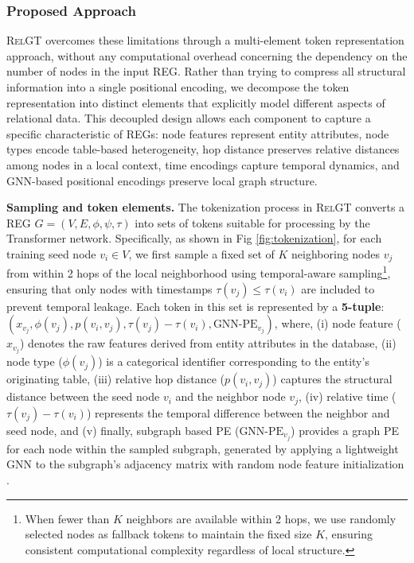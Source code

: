 \documentclass{article} %
\newcommand{\RelGT}{\textsc{RelGT}\xspace}
\begin{document}
\subsubsection{Proposed Approach}
\RelGT overcomes these limitations through a multi-element token representation approach, without any computational overhead concerning the dependency on the number of nodes in the input REG. Rather than trying to compress all structural information into a single positional encoding, we decompose the token representation into distinct elements that explicitly model different aspects of relational data. This decoupled
design allows each component to capture a specific characteristic of REGs: node features represent entity attributes, node types encode table-based heterogeneity, hop distance preserves relative distances among nodes in a local context, time encodings capture temporal dynamics, and GNN-based positional encodings preserve local graph structure. 


\textbf{Sampling and token elements.} The tokenization process in \RelGT converts a REG $G = (V, E, \phi, \psi, \tau)$ into sets of tokens suitable for processing by the Transformer network.
Specifically, as shown in Fig \ref{fig:tokenization}, for each training seed node $v_i \in V$, we first sample a fixed set of $K$ neighboring nodes $v_j$ from within 2 hops of the local neighborhood using temporal-aware sampling\footnote{When fewer than $K$ neighbors are available within 2 hops, we use randomly selected nodes as fallback tokens to maintain the fixed size $K$, ensuring consistent computational complexity regardless of local structure.}, ensuring that only nodes with timestamps $\tau(v_j) \leq \tau(v_i)$ are included to prevent temporal leakage. Each token in this set is represented by a \textbf{5-tuple}: $(x_{v_j}, \phi(v_j), p(v_i, v_j), \tau(v_j) - \tau(v_i), \text{GNN-PE}_{v_j})$, where, (i) node feature ($x_{v_j}$) denotes the raw features derived from entity attributes in the database, (ii) node type ($\phi(v_j)$) is a categorical identifier corresponding to the entity's originating table, (iii) relative hop distance ($p(v_i, v_j)$) captures the structural distance between the seed node $v_i$ and the neighbor node $v_j$, (iv) relative time ($\tau(v_j) - \tau(v_i)$) represents the temporal difference between the neighbor and seed node, and (v) finally, subgraph based PE ($\text{GNN-PE}_{v_j}$) provides a graph PE for each node within the sampled subgraph, generated by applying a lightweight GNN to the subgraph's adjacency 
matrix 
with random node feature initialization \citep{sato2021random, kanatsoulis2025learning}.
\end{document}
